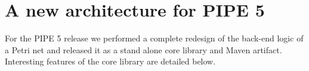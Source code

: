 \section{A new architecture for PIPE 5}
For the PIPE 5 release we performed a complete redesign of the back-end logic of a Petri net and released it as a stand alone core library and Maven artifact. Interesting features of the core library are detailed below.





